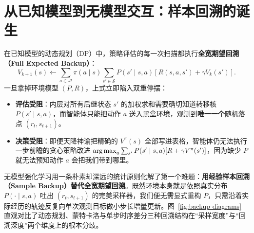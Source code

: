 \section{从已知模型到无模型交互：样本回溯的诞生}
\label{sec:rl-model-free-gap}

在已知模型的动态规划（DP）中，策略评估的每一次扫描都执行\textbf{全宽期望回溯（Full Expected Backup）}：
\[
  V_{k+1}(s) \leftarrow \sum_{a \in \mathcal{A}} \pi(a \mid s) \sum_{s' \in \mathcal{S}} P(s' \mid s, a)\!\left[R(s, a, s') + \gamma V_k(s')\right].
\]
一旦拿掉环境模型 $(P, R)$，上式立即陷入双重停摆：
\begin{itemize}
  \item \textbf{评估受阻}：内层对所有后继状态 $s'$ 的加权求和需要确切知道转移核 $P(s' \mid s, a)$，而智能体只能把动作 $a$ 送入黑盒环境，观测到\textbf{唯一一个}随机落点 $(r_t, s_{t+1})$。
  \item \textbf{决策受阻}：即便天降神谕把精确的 $V^\pi(s)$ 全部写进表格，智能体仍无法执行一步前瞻的贪心策略改进 $\operatorname*{arg\,max}_a \sum_{s'} P(s'\mid s,a)[R + \gamma V^\pi(s')]$，因为缺少 $P$ 就无法预知动作 $a$ 会把我们带到哪里。
\end{itemize}

无模型强化学习用一条朴素却深远的统计原则化解了第一个难题：\textbf{用经验样本回溯（Sample Backup）替代全宽期望回溯}。既然环境本身就是依照真实分布 $P(\cdot \mid s, a)$ 吐出 $(r_t, s_{t+1})$ 的完美采样器，我们便无需显式重构 $P$，只需沿着实际经历的轨迹反复向单次观测目标做小步长增量更新。图~\ref{fig:backup-diagrams} 直观对比了动态规划、蒙特卡洛与单步时序差分三种回溯结构在“采样宽度”与“回溯深度”两个维度上的根本分歧。

